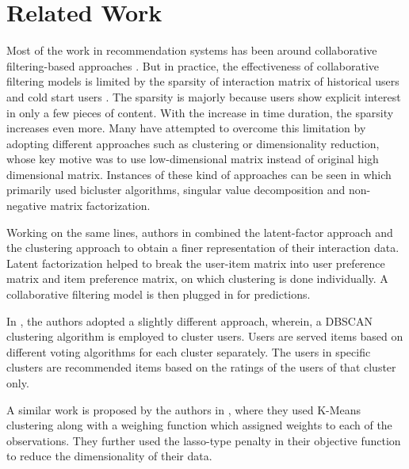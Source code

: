 \section{Related Work}

Most of the work in recommendation systems has been around collaborative filtering-based approaches \cite{zhang2014huiyi}. But in practice, the effectiveness of collaborative filtering models is limited by the sparsity of interaction matrix of historical users and cold start users \cite{ahn2008new}. The sparsity is majorly because users show explicit interest in only a few pieces of content. With the increase in time duration, the sparsity increases even more. Many have attempted to overcome this limitation by adopting different approaches such as clustering or dimensionality reduction, whose key motive was to use low-dimensional matrix instead of original high dimensional matrix. Instances of these kind of approaches can be seen in \cite{cheng2000biclustering} \cite{barragans2010hybrid} \cite{luo2014efficient} which primarily used bicluster algorithms, singular value decomposition and non-negative matrix factorization.  

Working on the same lines, authors in \cite{jin2020music} combined the latent-factor approach and the clustering approach to obtain a finer representation of their interaction data. Latent factorization helped to break the user-item matrix into user preference matrix and item preference matrix, on which clustering is done individually. A collaborative filtering model is then plugged in for predictions.  

In \cite{das2014clustering}, the authors adopted a slightly different approach, wherein, a DBSCAN clustering algorithm is employed to cluster users. Users are served items based on different voting algorithms for each cluster separately. The users in specific clusters are recommended items based on the ratings of the users of that cluster only.  

A similar work is proposed by the authors in \cite{brodinova2019robust}, where they used K-Means clustering along with a weighing function which assigned weights to each of the observations. They further used the lasso-type penalty in their objective function to reduce the dimensionality of their data. 